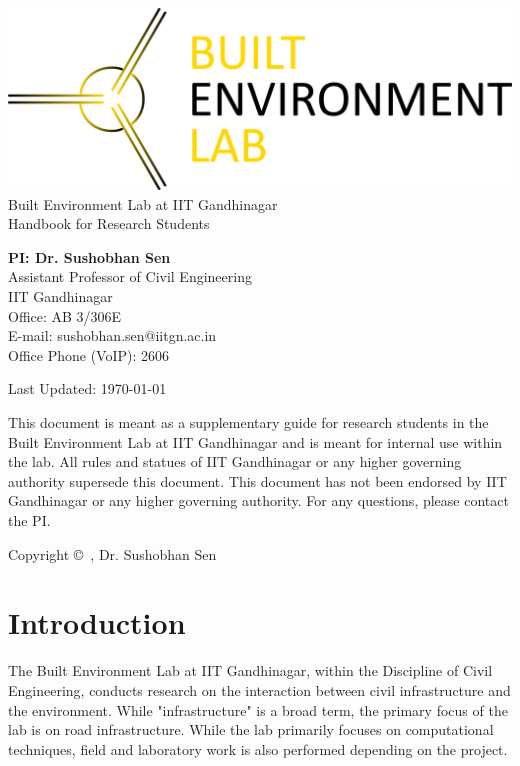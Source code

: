 \documentclass[12pt]{article}
\begin{document}
\begin{titlepage}
	\centering
	\includegraphics[scale=0.075]{BEL-logo.png} \\
	{\LARGE Built Environment Lab at IIT Gandhinagar \\
	\vspace{2cm}
	Handbook for Research Students}
	\vspace{2cm}
	
	\begin{large}	
	\textbf{PI: Dr. Sushobhan Sen} \\
	Assistant Professor of Civil Engineering \\
	IIT Gandhinagar \\
	Office: AB 3/306E \\
	E-mail: sushobhan.sen@iitgn.ac.in \\
	Office Phone (VoIP): 2606

	\vspace{2cm}
	\end{large}
	
	Last Updated: \today
\end{titlepage}

This document is meant as a supplementary guide for research students in the Built Environment Lab at IIT Gandhinagar and is meant for internal use within the lab. All rules and statues of IIT Gandhinagar or any higher governing authority supersede this document. This document has not been endorsed by IIT Gandhinagar or any higher governing authority. For any questions, please contact the PI.

\doclicenseThis

Copyright \copyright\ \the\year{}, Dr. Sushobhan Sen
\newpage

\tableofcontents
\newpage

\section{Introduction}
The Built Environment Lab at IIT Gandhinagar, within the Discipline of Civil Engineering, conducts research on the interaction between civil infrastructure and the environment. While "infrastructure" is a broad term, the primary focus of the lab is on road infrastructure. While the lab primarily focuses on computational techniques, field and laboratory work is also performed depending on the project. 
\end{document}
